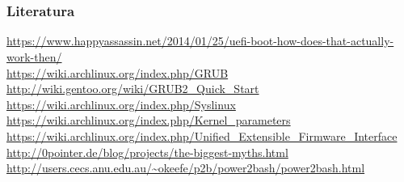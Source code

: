 \documentclass[t]{beamer}
\begin{document}
\section*{}
\begin{frame}
	\frametitle{Literatura}
	\url{https://www.happyassassin.net/2014/01/25/uefi-boot-how-does-that-actually-work-then/} \\
	\vfill
	\url{https://wiki.archlinux.org/index.php/GRUB} \\
	\url{http://wiki.gentoo.org/wiki/GRUB2_Quick_Start} \\
	\url{https://wiki.archlinux.org/index.php/Syslinux}
	\vfill
	\url{https://wiki.archlinux.org/index.php/Kernel_parameters} \\
	\url{https://wiki.archlinux.org/index.php/Unified_Extensible_Firmware_Interface}
	\vfill
	\url{http://0pointer.de/blog/projects/the-biggest-myths.html}
	\vfill
	\url{http://users.cecs.anu.edu.au/~okeefe/p2b/power2bash/power2bash.html}\\
\end{frame}
\end{document}
